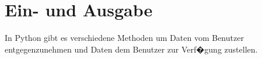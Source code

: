 \chapter{Ein- und Ausgabe}
\label{chapter:inputoutput}

In Python gibt es verschiedene Methoden um Daten vom Benutzer entgegenzunehmen und Daten dem Benutzer zur Verf�gung zustellen.


